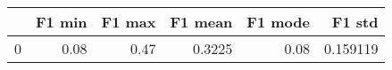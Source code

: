 \begin{tabular}{lrrrrr}
\toprule
{} &  F1 min &  F1 max &  F1 mean &  F1 mode &    F1 std \\
\midrule
0 &    0.08 &    0.47 &   0.3225 &     0.08 &  0.159119 \\
\bottomrule
\end{tabular}
